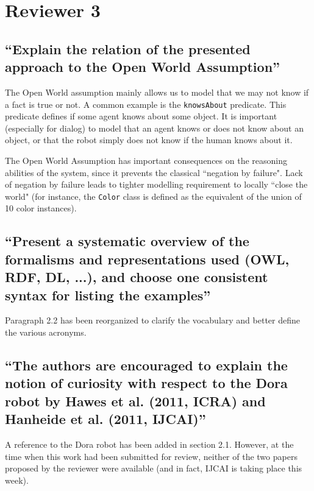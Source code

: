 \documentclass[11pt]{article}
\begin{document}
\section{Reviewer 3}

\subsection{``Explain the relation of the presented approach to the Open World
Assumption''}

The Open World assumption mainly allows us to model that we may not know if a
fact is true or not. A common example is the {\tt knowsAbout} predicate. This
predicate defines if some agent knows about some object. It is important
(especially for dialog) to model that an agent knows or  does not know about an
object, or that the robot simply does not know if the human knows about it.

The Open World Assumption has important consequences on the reasoning
abilities of the system, since it prevents the classical ``negation by 
failure". Lack of negation by failure leads to tighter modelling requirement to locally ``close the
world" (for instance, the {\tt Color} class is defined as the equivalent of
the union of 10 color instances).

\subsection{``Present a systematic overview of the formalisms and
representations used (OWL, RDF, DL, ...), and choose one consistent syntax for
listing the examples''}

Paragraph 2.2 has been reorganized to clarify the vocabulary and better
define the various acronyms.

\subsection{``The authors are encouraged to explain the notion of curiosity
with respect to the Dora robot by Hawes et al. (2011, ICRA) and Hanheide et al.
(2011, IJCAI)''}

A reference to the Dora robot has been added in section 2.1. However, at the
time when this work had been submitted for review, neither of the two papers proposed
by the reviewer were available (and in fact, IJCAI is taking place this
week).
\end{document}
